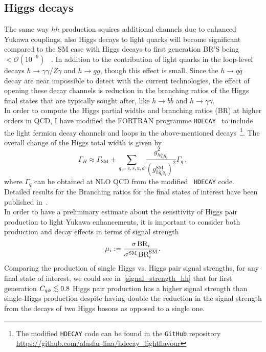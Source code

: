 \subsection{Higgs decays \label{sec:Hdecay}}
The same way $hh$ production squires  additional channels due to enhanced Yukawa couplings, also Higgs decays to light quarks will become significant compared to the SM case with Higgs decays to first generation BR'S being $<\mathcal{O}(10^{-9})$ ~\cite{deFlorian:2016spz}.  In addition to the contribution of light quarks in the loop-level decays $h \to \gamma \gamma/Z \gamma$ and $ h \to gg$, though this effect is small.  Since the $ h \to q\bar q$ decay are near impossible to detect with the current technologies, the effect of opening these decay channels is reduction in the branching ratios of the Higgs final states that are typically sought after, like $ h \to b \bar b $ and $ h \to \gamma \gamma$. \\ In order to compute the Higgs partial widths and branching ratios (BR) at higher orders in QCD, I have modified the FORTRAN programme \texttt{HDECAY}~\cite{Djouadi:1997yw,Djouadi:2018xqq} to include the light fermion decay channels and loops in the above-mentioned decays~\footnote{The modified \texttt{HDECAY} code can be found in the \texttt{GitHub} repository \url{https://github.com/alasfar-lina/hdecay_lightflavour}}. The overall change of the Higgs total width is given by
\begin{equation}
	\Gamma_H \approx \Gamma_{\text{SM}}+\sum_{q=c,s,u,d}\frac{g_{h \bar{q}_i q_i}^2}{(g_{h \bar{q}_i q_i}^{\text{SM}})^2}\Gamma_{q}\,,
\end{equation}
where $\Gamma_q$ can be obtained at NLO QCD from the modified ~\texttt{HDECAY} code. Detailed results for the Branching ratios for the final states of interest have been published in~\cite{Alasfar:2019pmn}.\\ 
In order to have a preliminary estimate about the sensitivity of Higgs pair production to light Yukawa enhancements, it is important to consider both production and decay effects in terms of signal strength
\begin{equation}
	\mu_i : = \frac{\sigma \, {\rm BR}_i } {\sigma^{\mathrm{SM}} \, {\rm BR}_i^{\mathrm{SM}}}.
\end{equation}
Comparing the production of single Higgs vs. Higgs pair signal strengths, for any final state of interest, we could see in~\autoref{signal_strength_hh} that for  first generation $C_{q \phi} \lesssim 0.8$ Higgs pair production has a higher signal strength than single-Higgs production despite having double the reduction in the signal strength from the decays of two Higgs bosons as opposed to a single one. 
